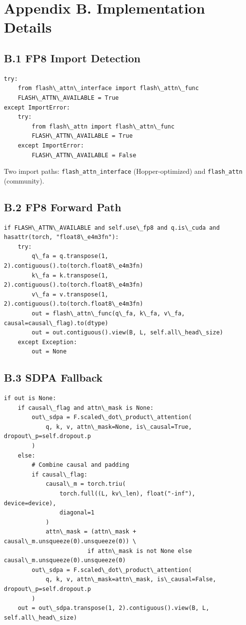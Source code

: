 
\section{Appendix B. Implementation Details}

\subsection{B.1 FP8 Import Detection}

\begin{lstlisting}
try:
    from flash\_attn\_interface import flash\_attn\_func
    FLASH\_ATTN\_AVAILABLE = True
except ImportError:
    try:
        from flash\_attn import flash\_attn\_func
        FLASH\_ATTN\_AVAILABLE = True
    except ImportError:
        FLASH\_ATTN\_AVAILABLE = False
\end{lstlisting}

Two import paths: \texttt{flash\_attn\_interface} (Hopper-optimized) and \texttt{flash\_attn} 
(community).

\subsection{B.2 FP8 Forward Path}

\begin{lstlisting}
if FLASH\_ATTN\_AVAILABLE and self.use\_fp8 and q.is\_cuda and hasattr(torch, "float8\_e4m3fn"):
    try:
        q\_fa = q.transpose(1, 2).contiguous().to(torch.float8\_e4m3fn)
        k\_fa = k.transpose(1, 2).contiguous().to(torch.float8\_e4m3fn)
        v\_fa = v.transpose(1, 2).contiguous().to(torch.float8\_e4m3fn)
        out = flash\_attn\_func(q\_fa, k\_fa, v\_fa, causal=causal\_flag).to(dtype)
        out = out.contiguous().view(B, L, self.all\_head\_size)
    except Exception:
        out = None
\end{lstlisting}

\subsection{B.3 SDPA Fallback}

\begin{lstlisting}
if out is None:
    if causal\_flag and attn\_mask is None:
        out\_sdpa = F.scaled\_dot\_product\_attention(
            q, k, v, attn\_mask=None, is\_causal=True, dropout\_p=self.dropout.p
        )
    else:
        # Combine causal and padding
        if causal\_flag:
            causal\_m = torch.triu(
                torch.full((L, kv\_len), float("-inf"), device=device),
                diagonal=1
            )
            attn\_mask = (attn\_mask + causal\_m.unsqueeze(0).unsqueeze(0)) \
                        if attn\_mask is not None else causal\_m.unsqueeze(0).unsqueeze(0)
        out\_sdpa = F.scaled\_dot\_product\_attention(
            q, k, v, attn\_mask=attn\_mask, is\_causal=False, dropout\_p=self.dropout.p
        )
    out = out\_sdpa.transpose(1, 2).contiguous().view(B, L, self.all\_head\_size)
\end{lstlisting}

